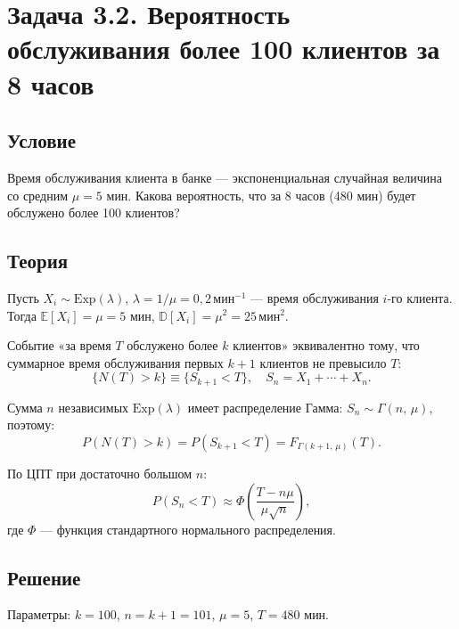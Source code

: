 \documentclass[a4paper,14pt]{article}
\begin{document}
\newpage
\section{Задача 3.2. Вероятность обслуживания более 100 клиентов за 8 часов}

\subsection*{Условие}

Время обслуживания клиента в банке — экспоненциальная случайная величина со средним $\mu = 5$ мин.
Какова вероятность, что за 8 часов (480 мин) будет обслужено более 100 клиентов?

\subsection*{Теория}

Пусть $X_i \sim \mathrm{Exp}(\lambda)$, $\lambda = 1/\mu = 0{,}2\,\text{мин}^{-1}$ — время обслуживания $i$-го клиента.
Тогда $\mathbb{E}[X_i] = \mu = 5$ мин, $\mathbb{D}[X_i] = \mu^2 = 25\,\text{мин}^2$.

Событие «за время $T$ обслужено более $k$ клиентов» эквивалентно тому, что суммарное время обслуживания первых $k{+}1$ клиентов не превысило $T$:
\begin{equation}
    \{N(T) > k\} \equiv \{S_{k+1} < T\}, \quad S_n = X_1 + \cdots + X_n.
    \label{eq:event}
\end{equation}

Сумма $n$ независимых $\mathrm{Exp}(\lambda)$ имеет распределение Гамма:
$S_n \sim \Gamma(n,\,\mu)$, поэтому:
\begin{equation}
    P(N(T) > k) = P(S_{k+1} < T) = F_{\Gamma(k+1,\,\mu)}(T).
    \label{eq:exact}
\end{equation}

По ЦПТ при достаточно большом $n$:
\begin{equation}
    P(S_n < T) \approx \Phi\!\left(\frac{T - n\mu}{\mu\sqrt{n}}\right),
    \label{eq:clt2}
\end{equation}
где $\Phi$ — функция стандартного нормального распределения.

\subsection*{Решение}

Параметры: $k = 100$, $n = k{+}1 = 101$, $\mu = 5$, $T = 480$ мин.
\end{document}

